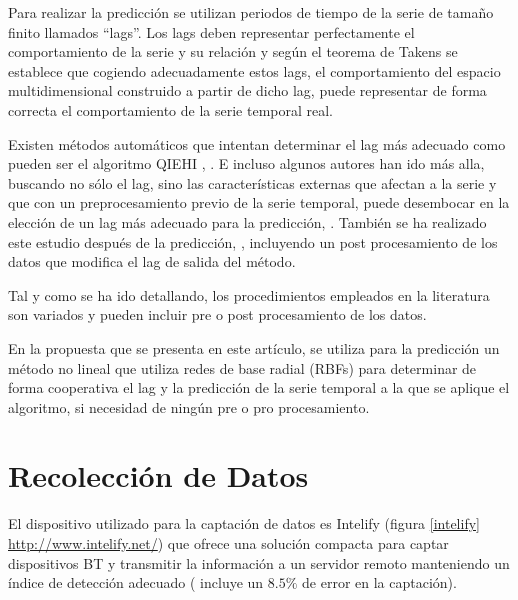 \documentclass[runningheads]{llncs}
\begin{document}
Para realizar la predicción se utilizan periodos de tiempo de la serie de tamaño
finito llamados ``lags''. Los lags deben representar perfectamente el comportamiento de la serie y
su relación y según el teorema de Takens \cite{Takens1980} se establece que cogiendo adecuadamente
estos lags, el comportamiento del espacio multidimensional construido a partir de dicho lag, puede
representar de forma correcta el comportamiento de la serie temporal real. 

Existen métodos automáticos que intentan determinar el lag más adecuado como pueden ser el
algoritmo QIEHI \cite{Araujo2010a}, \cite{Araujo2010b}. E incluso algunos autores han ido más alla,
buscando no sólo el lag, sino las características externas que afectan a la serie y que con un
preprocesamiento previo de la serie temporal, puede desembocar en la elección de un lag  más
adecuado para la predicción, \cite{garcia2008}. También se ha realizado este estudio después de la
predicción,  \cite{Maus2011}, incluyendo un post procesamiento de los datos que modifica el lag de
salida del método. 

Tal y como se ha ido detallando, los procedimientos empleados en la literatura son variados y
pueden incluir pre o post procesamiento de los datos. 

En la propuesta que se presenta en este artículo, se utiliza para la predicción un método no
lineal que utiliza redes de base radial (RBFs) para determinar de forma cooperativa el lag y la
predicción de la serie temporal a la que se aplique el algoritmo, si necesidad de ningún pre o pro
procesamiento. 




\section{Recolección de Datos}
\label{sec:hw}

El dispositivo utilizado para la captación de datos es Intelify (figura 
\ref{intelify} \url{http://www.intelify.net/}) que ofrece una solución compacta para captar
dispositivos BT y transmitir la información a un servidor remoto manteniendo un índice de detección
adecuado ( incluye un $8.5\%$ de error en la captación).
\end{document}
